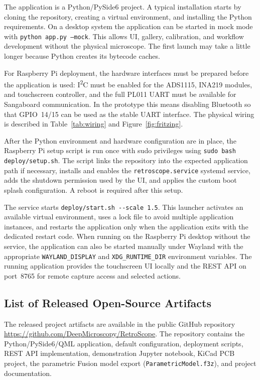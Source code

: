 The application is a Python/PySide6 project. A typical installation starts by cloning the repository, creating a virtual environment, and installing the Python requirements. On a desktop system the application can be started in mock mode with \texttt{python app.py --mock}. This allows UI, gallery, calibration, and workflow development without the physical microscope. The first launch may take a
little longer because Python creates its bytecode caches.

For Raspberry Pi deployment, the hardware interfaces must be prepared before the application is used: I\textsuperscript{2}C must be enabled for the ADS1115, INA219 modules, and touchscreen controller, and the full PL011 UART must be available for Sangaboard communication. In the prototype this means disabling Bluetooth so that GPIO~14/15 can be used as the stable UART interface. The physical wiring is described in Table~\ref{tab:wiring} and Figure~\ref{fig:fritzing}.

After the Python environment and hardware configuration are in place, the Raspberry Pi setup script is run once with sudo privileges using \texttt{sudo bash deploy/setup.sh}. The script links the repository into the expected application path if necessary, installs and enables the \texttt{retroscope.service} systemd service, adds the shutdown permission used by the UI, and applies the custom boot splash configuration. A reboot is required after this setup.

The service starts \texttt{deploy/start.sh \--\--scale 1.5}. This launcher activates an available virtual environment, uses a lock file to avoid multiple application instances, and restarts the application only when the application exits with the dedicated restart code. When running on the Raspberry Pi desktop without the service, the application can also be started manually under Wayland with the appropriate \texttt{WAYLAND\_DISPLAY} and \texttt{XDG\_RUNTIME\_DIR} environment variables. The running application provides the touchscreen UI locally and the REST API on port~8765 for remote capture access and selected actions.

\subsection{List of Released Open-Source Artifacts}\label{app:artifacts}

The released project artifacts are available in the public GitHub repository \url{https://github.com/DeepMicroscopy/RetroScope}. The repository contains the Python/PySide6/QML application, default configuration, deployment scripts, REST API implementation, demonstration Jupyter notebook, KiCad PCB project, the parametric Fusion model export (\texttt{ParametricModel.f3z}), and project documentation.
